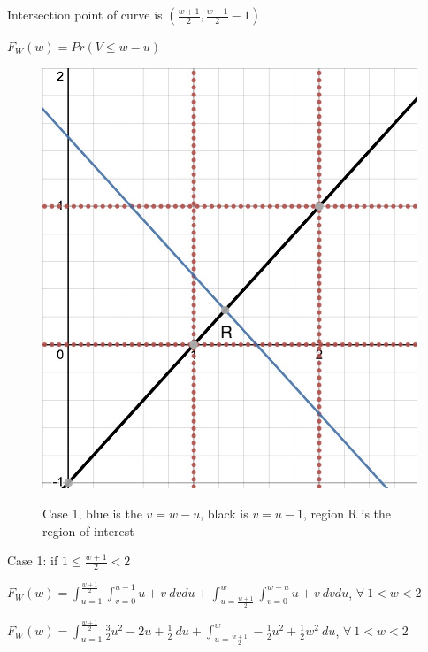 \documentclass{article} %
\begin{document}
    Intersection point of curve is $(\frac{w+1}{2},\frac{w+1}{2}-1)$

    $F_W(w)=Pr(V \leq w-u)$

    \begin{figure}[h]
        \centering
        \includegraphics[scale=0.25]{HW/HW4/p1c_case1.jpg}
        \label{fig:$F_W$}
        \caption{Case 1, blue is the $v = w-u$, black is $v = u-1$, region R is the region of interest}    
    \end{figure}
    
    Case 1: if $1 \leq \frac{w+1}{2} < 2$

    $F_W(w)=\int_{u=1}^{\frac{w+1}{2}}\int_{v=0}^{u-1}u+v \ dvdu + \int_{u=\frac{w+1}{2}}^{w}\int_{v=0}^{w-u}u+v \ dvdu$, $\forall \ 1 < w <2$

    $F_W(w)=\int_{u=1}^{\frac{w+1}{2}}\frac{3}{2}u^2-2u+\frac{1}{2}\ du+\int_{u=\frac{w+1}{2}}^{w}-\frac{1}{2}u^2+\frac{1}{2}w^2\ du$, $\forall \ 1 < w <2$
\end{document}
